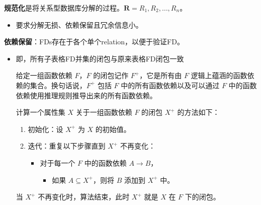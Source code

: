 \documentclass[b5paper, twoside]{article}
\let\oldtextbf\textbf
\renewcommand{\textbf}[1]{\textcolor{myblue}{\oldtextbf{#1}}}
\newenvironment{smallmdframed}
  {\begin{mdframed}[linewidth=0pt, backgroundcolor=pink!20]\small}
  {\end{mdframed}}
\begin{document}
\textbf{规范化}是将关系型数据库分解的过程。$\mathbf{R}=R_1, R_2, \dots, R_n$。
\begin{itemize}
    \item 要求分解无损、依赖保留且冗余信息小。
\end{itemize}

\textbf{依赖保留}：FDs存在于各个单个relation，以便于验证FD。
\begin{itemize}
    \item 即，所有子表格FD并集的闭包与原来表格FD闭包一致
\begin{smallmdframed}
    给定一组函数依赖 $F$，$F$ 的闭包记作 $F^+$，它是所有由 $F$ 逻辑上蕴涵的函数依赖的集合。换句话说，$F^+$ 包括 $F$ 中的所有函数依赖以及可以通过 $F$ 中的函数依赖使用推理规则推导出来的所有函数依赖。

    计算一个属性集 $X$ 关于一组函数依赖 $F$ 的闭包 $X^+$ 的方法如下：

    \begin{enumerate}
    \item {初始化}：设 $X^+$ 为 $X$ 的初始值。
    \item {迭代}：重复以下步骤直到 $X^+$ 不再变化：
        \begin{itemize}
            \item 对于每一个 $F$ 中的函数依赖 $A \rightarrow B$，
                \begin{itemize}
                    \item 如果 $A \subseteq X^+$，则将 $B$ 添加到 $X^+$ 中。
                \end{itemize}
        \end{itemize}
    \end{enumerate}

    当 $X^+$ 不再变化时，算法结束，此时 $X^+$ 就是 $X$ 在 $F$ 下的闭包。
\end{smallmdframed}
\end{itemize}
\end{document}
